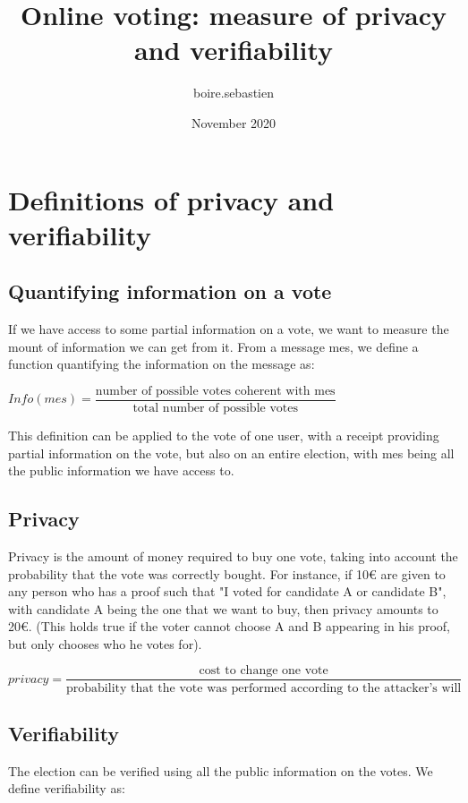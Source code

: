 \documentclass{article}
\title{Online voting: measure of privacy and verifiability}
\author{boire.sebastien }
\date{November 2020}
\begin{document}
\maketitle


\section{Definitions of privacy and verifiability}

\subsection{Quantifying information on a vote}

If we have access to some partial information on a vote, we want to measure the mount of information we can get from it. From a message mes, we define a function quantifying the information on the message as:

$Info(mes)=\dfrac{\text{number of possible votes coherent with mes}}{\text{total number of possible votes}}$

This definition can be applied to the vote of one user, with a receipt providing partial information on the vote, but also on an entire election, with mes being all the public information we have access to.


\subsection{Privacy}

Privacy is the amount of money required to buy one vote, taking into account the probability that the vote was correctly bought. For instance, if 10€ are given to any person who has a proof such that "I voted for candidate A or candidate B", with candidate A being the one that we want to buy, then privacy amounts to 20€. (This holds true if the voter cannot choose A and B appearing in his proof, but only chooses who he votes for).


$privacy=\dfrac{\text{cost to change one vote}}{\text{probability that the vote was performed according to the attacker's will}}$


\subsection{Verifiability}

The election can be verified using all the public information on the votes. We define verifiability as:
\end{document}
